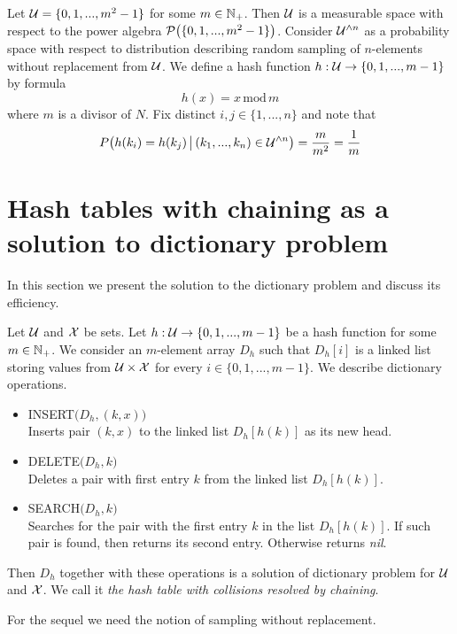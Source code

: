 \begin{example}\label{example:interval_of_integers_with_modulo_hash_function_as_an_example_of_almost_suh}
Let ${\mathcal U} = \{0,1,...,m^2-1\}$ for some $m\in {\mathbb N}_+$. Then ${\mathcal U}$ is a measurable space with respect to the power algebra ${\mathcal P}\big(\{0,1,...,m^2-1\}\big)$. Consider ${\mathcal U}^{\wedge n}$ as a probability space with respect to distribution describing random sampling of $n$-elements without replacement from ${\mathcal U}$. We define a hash function $h:{\mathcal U} \rightarrow \{0,1,...,m-1\}$ by formula
$$h(x) = x\,\mathrm{mod}\,m$$
where $m$ is a divisor of $N$. Fix distinct $i,j\in \{1,...,n\}$ and note that
$$P\big(h(k_i) = h(k_j)\,\big|\,(k_1,...,k_n)\in {\mathcal U}^{\wedge n}\big) = \frac{m}{m^2} = \frac{1}{m}$$
\end{example}

\section{Hash tables with chaining as a solution to dictionary problem}
\noindent
In this section we present the solution to the dictionary problem and discuss its efficiency.

\begin{definition}
Let ${\mathcal U}$ and ${\mathcal X}$ be sets. Let $h:{\mathcal U}\rightarrow \{0,1,...,m-1\}$ be a hash function for some $m\in {\mathbb N}_+$. We consider an $m$-element array $D_h$ such that $D_h[i]$ is a linked list storing values from ${\mathcal U}\times {\mathcal X}$ for every $i\in \{0,1,...,m-1\}$. We describe dictionary operations.
\begin{itemize}
\item[] \textrm{INSERT}$\big(D_h,(k,x)\big)$\\
Inserts pair $(k,x)$ to the linked list $D_h[h(k)]$ as its new head.
\item[] \textrm{DELETE}$\big(D_h,k\big)$\\
Deletes a pair with first entry $k$ from the linked list $D_h[h(k)]$.
\item[] \textrm{SEARCH}$\big(D_h,k\big)$\\
Searches for the pair with the first entry $k$ in the list $D_h[h(k)]$. If such pair is found, then returns its second entry. Otherwise returns \textit{nil}. 
\end{itemize}
Then $D_h$ together with these operations is a solution of dictionary problem for ${\mathcal U}$ and ${\mathcal X}$. We call it \textit{the hash table with collisions resolved by chaining}.
\end{definition}
\noindent
For the sequel we need the notion of sampling without replacement.


